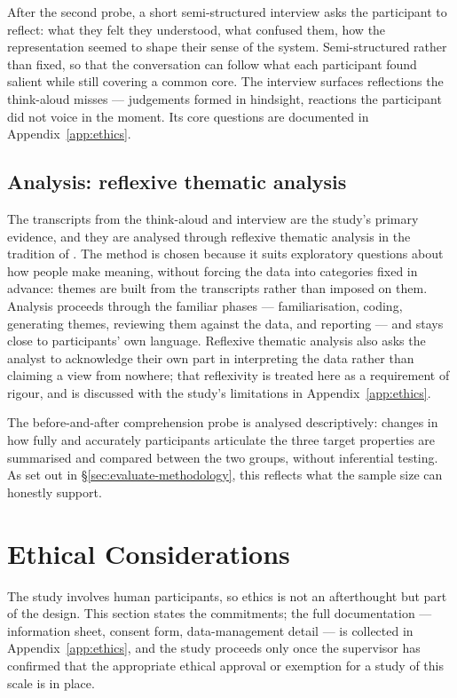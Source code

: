 After the second probe, a short semi-structured interview asks the participant to reflect: what they felt they understood, what confused them, how the representation seemed to shape their sense of the system. Semi-structured rather than fixed, so that the conversation can follow what each participant found salient while still covering a common core. The interview surfaces reflections the think-aloud misses --- judgements formed in hindsight, reactions the participant did not voice in the moment. Its core questions are documented in Appendix~\ref{app:ethics}.
 
\subsection{Analysis: reflexive thematic analysis}
\label{subsec:instr-analysis}
 
The transcripts from the think-aloud and interview are the study's primary evidence, and they are analysed through reflexive thematic analysis in the tradition of \citet{braunclarke2006, braunclarke2019}. The method is chosen because it suits exploratory questions about how people make meaning, without forcing the data into categories fixed in advance: themes are built from the transcripts rather than imposed on them. Analysis proceeds through the familiar phases --- familiarisation, coding, generating themes, reviewing them against the data, and reporting --- and stays close to participants' own language. Reflexive thematic analysis also asks the analyst to acknowledge their own part in interpreting the data rather than claiming a view from nowhere; that reflexivity is treated here as a requirement of rigour, and is discussed with the study's limitations in Appendix~\ref{app:ethics}.
 
The before-and-after comprehension probe is analysed descriptively: changes in how fully and accurately participants articulate the three target properties are summarised and compared between the two groups, without inferential testing. As set out in \S\ref{sec:evaluate-methodology}, this reflects what the sample size can honestly support.
 
\section{Ethical Considerations}
\label{sec:ethics-methodology}
 
The study involves human participants, so ethics is not an afterthought but part of the design. This section states the commitments; the full documentation --- information sheet, consent form, data-management detail --- is collected in Appendix~\ref{app:ethics}, and the study proceeds only once the supervisor has confirmed that the appropriate ethical approval or exemption for a study of this scale is in place.
 
